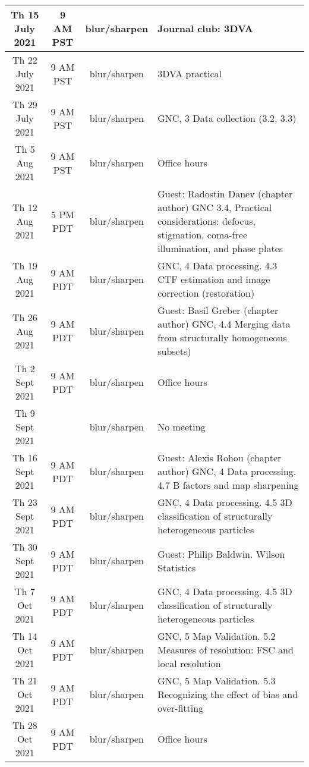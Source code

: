 \documentclass[11pt, oneside]{article}   	%
\begin{document}
\begin{center}
\begin{longtable}{|| c c c p{90mm} ||}
 \hline
Th 15 July 2021 & \tiny{9 AM PST} & blur/sharpen & Journal club: 3DVA \\
 \hline
Th 22 July 2021 & \tiny{9 AM PST} & blur/sharpen & 3DVA practical \\
 \hline
Th 29 July 2021 & \tiny{9 AM PST} & blur/sharpen & GNC, 3 Data collection (3.2, 3.3) \\
 \hline
Th 5 Aug 2021& \tiny{9 AM PST} & blur/sharpen & Office hours  \\ 
 \hline
Th 12 Aug 2021& \tiny{5 PM PDT} & blur/sharpen & \tiny{Guest: Radostin Danev (chapter author) GNC 3.4, Practical considerations: defocus, stigmation, coma-free illumination, and phase plates}  \\ 
 \hline
Th 19 Aug 2021& \tiny{9 AM PDT} & blur/sharpen & \tiny{GNC, 4 Data processing. 4.3 CTF estimation and image correction (restoration)} \\
 \hline
Th 26 Aug 2021& \tiny{9 AM PDT} & blur/sharpen &  \tiny{Guest: Basil Greber (chapter author) GNC, 4.4 Merging data from structurally homogeneous subsets)} \\ 
 \hline
Th 2 Sept 2021& \tiny{9 AM PDT} & blur/sharpen & Office hours  \\ 
 \hline
Th 9 Sept 2021&  & blur/sharpen & No meeting  \\ %
 \hline
Th 16 Sept 2021& \tiny{9 AM PDT} & blur/sharpen & \tiny{Guest: Alexis Rohou (chapter author) GNC, 4 Data processing. 4.7 B factors and map sharpening}  \\
 \hline
Th 23 Sept 2021& \tiny{9 AM PDT} & blur/sharpen & \tiny{GNC, 4 Data processing. 4.5 3D classification of structurally heterogeneous particles}  \\ %
 \hline
Th 30 Sept 2021& \tiny{9 AM PDT} & blur/sharpen & \tiny{Guest: Philip Baldwin. Wilson Statistics}  \\ 
 \hline
  Th 7 Oct 2021& \tiny{9 AM PDT} & blur/sharpen & \tiny{GNC, 4 Data processing. 4.5 3D classification of structurally heterogeneous particles}  \\ %
 \hline
Th 14 Oct 2021& \tiny{9 AM PDT} & blur/sharpen & \tiny{GNC, 5 Map Validation. 5.2 Measures of resolution: FSC and local resolution}  \\ 
 \hline
Th 21 Oct 2021& \tiny{9 AM PDT} & blur/sharpen & \tiny{GNC, 5 Map Validation. 5.3 Recognizing the effect of bias and over-fitting}  \\ 
 \hline
Th 28 Oct 2021& \tiny{9 AM PDT} & blur/sharpen & Office hours  \\ 

\end{longtable}
\end{center}
\end{document}
